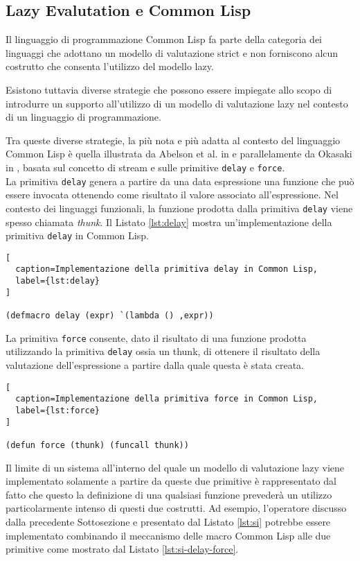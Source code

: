 \subsection{Lazy Evalutation e Common Lisp}
\label{lazy-eval-cl}

Il linguaggio di programmazione Common Lisp fa parte della categoria dei
linguaggi che adottano un modello di valutazione strict e non forniscono alcun
costrutto che consenta l'utilizzo del modello lazy.

Esistono tuttavia diverse strategie che possono essere impiegate allo scopo di
introdurre un supporto all'utilizzo di un modello di valutazione lazy nel
contesto di un linguaggio di programmazione.

Tra queste diverse strategie, la più nota e più adatta al contesto del
linguaggio Common Lisp è quella illustrata da Abelson et al. in
\cite{Abelson1996} e parallelamente da Okasaki in
\cite{DBLP:conf/afp/Okasaki96}, basata sul concetto di stream e sulle primitive
\texttt{delay} e \texttt{force}.\\

La primitiva \texttt{delay} genera a partire da una data espressione una
funzione che può essere invocata ottenendo come risultato il valore associato
all'espressione. Nel contesto dei linguaggi funzionali, la funzione prodotta
dalla primitiva \texttt{delay} viene spesso chiamata \textit{thunk}. Il Listato
\ref{lst:delay} mostra un'implementazione della primitiva \texttt{delay} in
Common Lisp.

\begin{lstlisting}[
  caption=Implementazione della primitiva delay in Common Lisp,
  label={lst:delay}
]

(defmacro delay (expr) `(lambda () ,expr))

\end{lstlisting}

La primitiva \texttt{force} consente, dato il risultato di una funzione prodotta
utilizzando la primitiva \texttt{delay} ossia un thunk, di ottenere il risultato
della valutazione dell'espressione a partire dalla quale questa è stata creata.

\begin{lstlisting}[
  caption=Implementazione della primitiva force in Common Lisp,
  label={lst:force}
]

(defun force (thunk) (funcall thunk))

\end{lstlisting}

Il limite di un sistema all'interno del quale un modello di valutazione lazy
viene implementato solamente a partire da queste due primitive è rappresentato
dal fatto che questo la definizione di una qualsiasi funzione prevederà un
utilizzo particolarmente intenso di questi due costrutti. Ad esempio,
l'operatore discusso dalla precedente Sottosezione e presentato dal Listato
\ref{lst:si} potrebbe essere implementato combinando il meccanismo delle macro
Common Lisp alle due primitive come mostrato dal Listato
\ref{lst:si-delay-force}.

